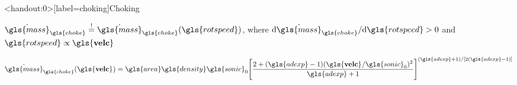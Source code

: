 \documentclass[compress, english]{beamer}%
\begin{document}
\begin{frame}<handout:0>[label=choking]{Choking\autocites[43]{guzzella_introduction_2010}[310]{dixon_fluid_2014}}
\begin{minipage}{0.45\textwidth}
\small
\def\svgwidth{1\textwidth}
\only<+>{}
\only<+->{}%
\end{minipage}%
\hspace{\fill}%
\begin{minipage}{0.4\textwidth}
\pause[\thebeamerpauses]
\raggedright
\(\dot{\gls{mass}}_{\gls{choke}} \overset{!}{=} \dot{\gls{mass}}_{\gls{choke}} (\gls{rotspeed})\), where \(\dd{\dot{\gls{mass}}_{\gls{choke}}}/\dd{\gls{rotspeed}} > 0\) and \(\gls{rotspeed} \propto \vectcomp{\gls{velc}}{}{}\)
\end{minipage}

\vspace*{\fill}

\pause
\begin{equation*}
\dot{\gls{mass}}_{\gls{choke}}(\vectcomp{\gls{velc}}{}{}) = \gls{area}\gls{density}\gls{sonic}_{0} \Bigg[\frac{2 + (\gls{adexp} - 1) (\vectcomp{\gls{velc}}{}{} / \gls{sonic}_{0})^2}{\gls{adexp} + 1}\Bigg]^{(\gls{adexp} + 1)/[2(\gls{adexp} - 1)]}
\end{equation*}
\end{frame}
\end{document}
